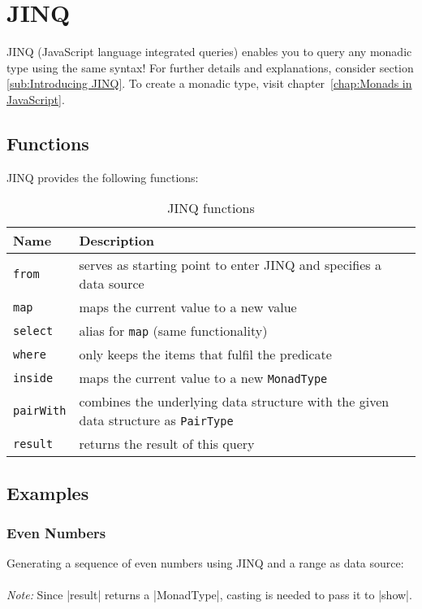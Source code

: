 \section{JINQ} %
\label{sec:API_JINQ}
JINQ (JavaScript language integrated queries) enables you to query any monadic
type using the same syntax!
\newline
For further details and explanations, consider section \ref{sub:Introducing JINQ}.
\newline
To create a monadic type, visit chapter~\ref{chap:Monads in JavaScript}.

\subsection{Functions}
\label{sub:JINQ_Functions}
JINQ provides the following functions:

\begin{table}[H]
  \centering
  \begin{tabularx}{\textwidth}{| l | X |} \hline
    \textbf{Name}       & \textbf{Description} \\ \hline
    \texttt{from}       & serves as starting point to enter JINQ and specifies a data source \\ \hline 
    \texttt{map}        & maps the current value to a new value \\ \hline 
    \texttt{select}     & alias for \texttt{map} (same functionality) \\ \hline 
    \texttt{where}      & only keeps the items that fulfil the predicate \\ \hline
    \texttt{inside}     & maps the current value to a new \texttt{MonadType} \\ \hline 
    \texttt{pairWith}   & combines the underlying data structure with the given data structure as \texttt{PairType} \\ \hline 
    \texttt{result}     & returns the result of this query\\ \hline 

  \end{tabularx}
  \caption{JINQ functions}
  \label{tab:jinq_functions}
\end{table}

\subsection{Examples}
\label{sub:JINQ_Examples}

\subsubsection{Even Numbers}
\label{subsub:JINQ_Even Numbers}
Generating a sequence of even numbers using JINQ and a range as data source:\\
\\
\textit{Note:} Since |result| returns a |MonadType|, casting is needed
to pass it to |show|.


